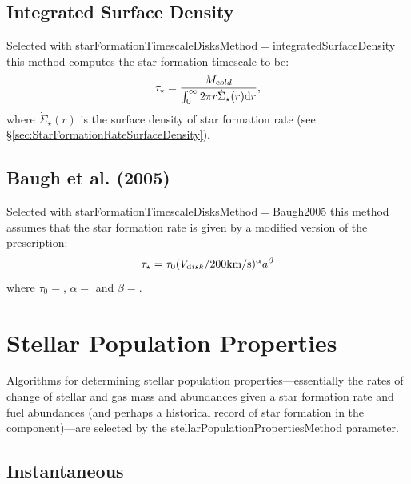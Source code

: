 \subsection{Integrated Surface Density}

Selected with {\normalfont \ttfamily starFormationTimescaleDisksMethod}$=${\normalfont \ttfamily integratedSurfaceDensity} this method computes the star formation timescale to be:
\begin{equation}
 \tau_\star =  {M_{\mathrm cold} \over \int_0^\infty 2 \pi r \dot{\Sigma}_\star(r) {\mathrm d}r},
\end{equation}
where $\dot{\Sigma}_\star(r)$ is the surface density of star formation rate (see \S\ref{sec:StarFormationRateSurfaceDensity}).

\subsection{Baugh et al. (2005)}

Selected with {\normalfont \ttfamily starFormationTimescaleDisksMethod}$=${\normalfont \ttfamily Baugh2005} this method assumes that the star formation rate is given by a modified version of the \cite{baugh_can_2005} prescription:
\begin{equation}
\tau_\star = \tau_0 (V_{\mathrm disk}/200\hbox{km/s})^\alpha a^\beta
\end{equation}
where $\tau_0=${\normalfont \ttfamily [starFormationDiskTimescale]}, $\alpha=${\normalfont \ttfamily [starFormationDiskVelocityExponent]} and $\beta=${\normalfont \ttfamily [starFormationExpansionExponent]}.

\section{Stellar Population Properties}\label{sec:StellarPopulationProperties}

Algorithms for determining stellar population properties---essentially the rates of change of stellar and gas mass and abundances given a star formation rate and fuel abundances (and perhaps a historical record of star formation in the component)---are selected by the {\normalfont \ttfamily stellarPopulationPropertiesMethod} parameter.

\subsection{Instantaneous}

